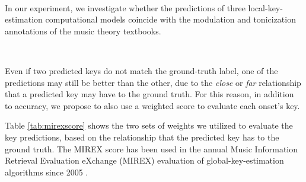 
~\label{sec:exp}

In our experiment, we investigate whether the predictions of
three local-key-estimation computational models coincide
with the modulation and tonicization annotations of the
music theory textbooks.

~\label{sec:evaluations}

Even if two predicted keys do not match the ground-truth
label, one of the predictions may still be better than the
other, due to the \emph{close} or \emph{far} relationship
that a predicted key may have to the ground truth. For this
reason, in addition to accuracy, we propose to also use a
weighted score to evaluate each onset's key.

Table \ref{tab:mirexscore} shows the two sets of weights we
utilized to evaluate the key predictions, based on the
relationship that the predicted key has to the ground truth.
The MIREX score has been used in the annual Music
Information Retrieval Evaluation eXchange (MIREX) evaluation
of global-key-estimation algorithms since 2005
\parencite{downie2005}.



